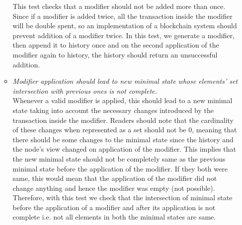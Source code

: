 \begin{enumerate}[\IEEEsetlabelwidth{Z}]
\begin{itemize}[]
This test checks that a modifier should not be added more than once. Since if a modifier is added twice, all the transaction inside the modifier will be double spent, so an implementation of a blockchain system should prevent addition of a modifier twice. In this test, we generate a modifier, then append it to history once and on the second application of the modifier again to history, the history should return an unsuccessful addition.
\item \textit{Modifier application should lead to new minimal state whose elements' set intersection with previous ones is not complete.}\\
Whenever a valid modifier is applied, this should lead to a new minimal state taking into account the necessary changes introduced by the transaction inside the modifier. Readers should note that the cardinality of these changes when represented as a set should not be 0, meaning that there should be some changes to the minimal state since the history and the node's view changed on application of the modifier. This implies that the new minimal state should not be completely same as the previous minimal state before the application of the modifier. If they both were same, this would mean that the application of the modifier did not change anything and hence the modifier was empty (not possible). Therefore, with this test we check that the intersection of minimal state before the application of a modifier and after its application is not complete i.e. not all elements in both the minimal states are same.
\end{itemize}
\end{enumerate}




